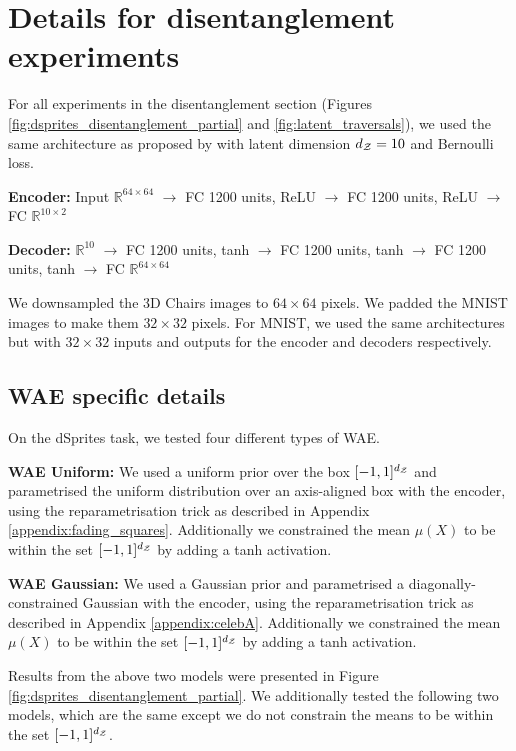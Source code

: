 \section{Details for disentanglement experiments}\label{appendix:disentanglement}

For all experiments in the disentanglement section (Figures \ref{fig:dsprites_disentanglement_partial} and \ref{fig:latent_traversals}), we used the same architecture as proposed by \cite{HM+17} with latent dimension $d_{\mathcal{Z}}=10$ and Bernoulli loss.

\textbf{Encoder:} Input $\mathbb{R}^{64 \times 64}$ $\rightarrow$ FC 1200 units, ReLU $\rightarrow$ FC 1200 units, ReLU $\rightarrow$ FC $\mathbb{R}^{10\times 2}$

\textbf{Decoder:} $\mathbb{R}^{10}$ $\rightarrow$ FC 1200 units, tanh $\rightarrow$ FC 1200 units, tanh $\rightarrow$  FC 1200 units, tanh $\rightarrow$  FC $\mathbb{R}^{64\times 64}$

We downsampled the 3D Chairs images to $64\!\times\!64$ pixels. We padded the MNIST images to make them $32\!\times\!32$ pixels. For MNIST, we used the same architectures but with $32\!\times\!32$ inputs and outputs for the encoder and decoders respectively.

\subsection{WAE specific details}

On the dSprites task, we tested four different types of WAE.

\textbf{WAE Uniform:} We used a uniform prior over the box $[-1, 1]^{d_{\mathcal{Z}}}$ and parametrised the uniform distribution over an axis-aligned box with the encoder, using the reparametrisation trick as described in Appendix \ref{appendix:fading_squares}. Additionally we constrained the mean $\mu(X)$ to be within the set $[-1,1]^{d_{\mathcal{Z}}}$ by adding a tanh activation.

\textbf{WAE Gaussian:} We used a Gaussian prior and parametrised a diagonally-constrained Gaussian with the encoder, using the reparametrisation trick as described in Appendix \ref{appendix:celebA}. Additionally we constrained the mean $\mu(X)$ to be within the set $[-1,1]^{d_{\mathcal{Z}}}$ by adding a tanh activation.

Results from the above two models were presented in Figure \ref{fig:dsprites_disentanglement_partial}. We additionally tested the following two models, which are the same except we do not constrain the means to be within the set $[-1,1]^{d_{\mathcal{Z}}}$.

